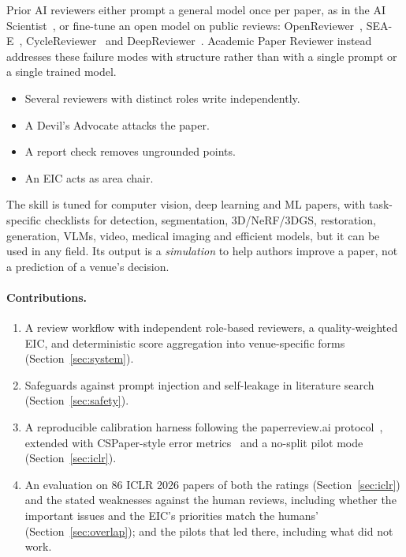 \documentclass[11pt,a4paper]{article}
\begin{document}
Prior AI reviewers either prompt a general model once per paper, as in the AI
Scientist~\citep{lu2024aiscientist}, or fine-tune an open model on public reviews:
OpenReviewer~\citep{idahl2025openreviewer}, SEA-E~\citep{yu2024sea},
CycleReviewer~\citep{weng2025cycleresearcher} and DeepReviewer~\citep{zhu2025deepreview}.
Academic Paper Reviewer instead addresses these failure modes with structure rather than with a
single prompt or a single trained model.
\begin{itemize}
\item Several reviewers with distinct roles write independently.
\item A Devil's Advocate attacks the paper.
\item A report check removes ungrounded points.
\item An EIC acts as area chair.
\end{itemize}
The skill is tuned for computer vision, deep learning and ML papers, with task-specific checklists
for detection, segmentation, 3D/NeRF/3DGS, restoration, generation, VLMs, video, medical imaging
and efficient models, but it can be used in any field. Its output is a \emph{simulation} to help
authors improve a paper, not a prediction of a venue's decision.

\paragraph{Contributions.}
\begin{enumerate}
\item A review workflow with independent role-based reviewers, a quality-weighted EIC, and
deterministic score aggregation into venue-specific forms (Section~\ref{sec:system}).
\item Safeguards against prompt injection and self-leakage in literature search
(Section~\ref{sec:safety}).
\item A reproducible calibration harness following the paperreview.ai protocol~\citep{paperreview},
extended with CSPaper-style error metrics~\citep{cspaper} and a no-split pilot mode
(Section~\ref{sec:iclr}).
\item An evaluation on 86 ICLR 2026 papers of both the ratings (Section~\ref{sec:iclr}) and the
stated weaknesses against the human reviews, including whether the important issues and the
EIC's priorities match the humans' (Section~\ref{sec:overlap}); and the pilots that led there,
including what did not work.
\end{enumerate}
\end{document}

